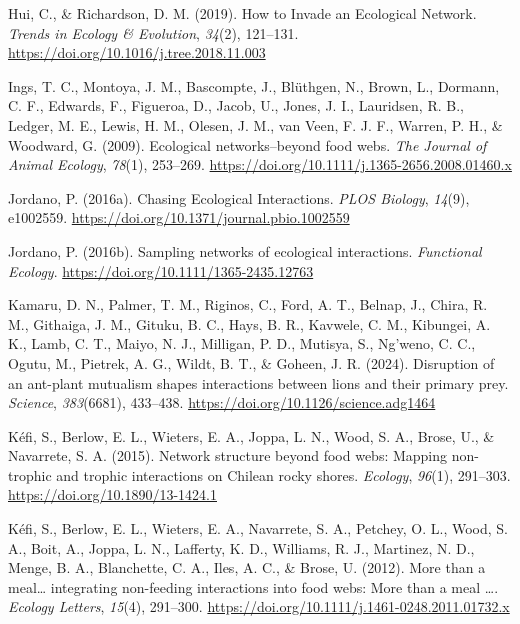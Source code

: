 \documentclass[
]{article}
\newlength{\cslhangindent}
\newenvironment{CSLReferences}[2] %
 {\begin{list}{}{%
  \setlength{\itemindent}{0pt}
  \setlength{\leftmargin}{0pt}
  \setlength{\parsep}{0pt}
  \ifodd #1
   \setlength{\leftmargin}{\cslhangindent}
   \setlength{\itemindent}{-1\cslhangindent}
  \fi
  \setlength{\itemsep}{#2\baselineskip}}}
 {\end{list}}
\begin{document}
\begin{CSLReferences}{1}{0}
Hui, C., \& Richardson, D. M. (2019). How to {Invade} an {Ecological
Network}. \emph{Trends in Ecology \& Evolution}, \emph{34}(2), 121--131.
\url{https://doi.org/10.1016/j.tree.2018.11.003}

Ings, T. C., Montoya, J. M., Bascompte, J., Blüthgen, N., Brown, L.,
Dormann, C. F., Edwards, F., Figueroa, D., Jacob, U., Jones, J. I.,
Lauridsen, R. B., Ledger, M. E., Lewis, H. M., Olesen, J. M., van Veen,
F. J. F., Warren, P. H., \& Woodward, G. (2009). Ecological
networks--beyond food webs. \emph{The Journal of Animal Ecology},
\emph{78}(1), 253--269.
\url{https://doi.org/10.1111/j.1365-2656.2008.01460.x}

Jordano, P. (2016a). Chasing {Ecological Interactions}. \emph{PLOS
Biology}, \emph{14}(9), e1002559.
\url{https://doi.org/10.1371/journal.pbio.1002559}

Jordano, P. (2016b). Sampling networks of ecological interactions.
\emph{Functional Ecology}. \url{https://doi.org/10.1111/1365-2435.12763}

Kamaru, D. N., Palmer, T. M., Riginos, C., Ford, A. T., Belnap, J.,
Chira, R. M., Githaiga, J. M., Gituku, B. C., Hays, B. R., Kavwele, C.
M., Kibungei, A. K., Lamb, C. T., Maiyo, N. J., Milligan, P. D.,
Mutisya, S., Ng'weno, C. C., Ogutu, M., Pietrek, A. G., Wildt, B. T., \&
Goheen, J. R. (2024). Disruption of an ant-plant mutualism shapes
interactions between lions and their primary prey. \emph{Science},
\emph{383}(6681), 433--438.
\url{https://doi.org/10.1126/science.adg1464}

Kéfi, S., Berlow, E. L., Wieters, E. A., Joppa, L. N., Wood, S. A.,
Brose, U., \& Navarrete, S. A. (2015). Network structure beyond food
webs: Mapping non-trophic and trophic interactions on {Chilean} rocky
shores. \emph{Ecology}, \emph{96}(1), 291--303.
\url{https://doi.org/10.1890/13-1424.1}

Kéfi, S., Berlow, E. L., Wieters, E. A., Navarrete, S. A., Petchey, O.
L., Wood, S. A., Boit, A., Joppa, L. N., Lafferty, K. D., Williams, R.
J., Martinez, N. D., Menge, B. A., Blanchette, C. A., Iles, A. C., \&
Brose, U. (2012). More than a meal{\ldots{}} integrating non-feeding
interactions into food webs: {More} than a meal {\ldots{}}.
\emph{Ecology Letters}, \emph{15}(4), 291--300.
\url{https://doi.org/10.1111/j.1461-0248.2011.01732.x}


\end{CSLReferences}
\end{document}
